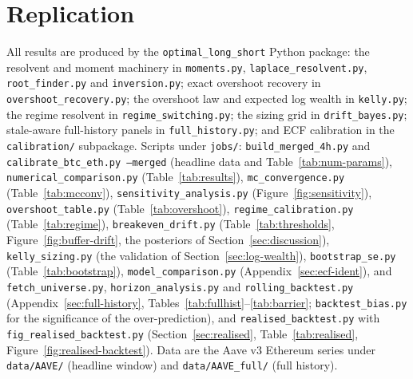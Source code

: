 \documentclass[11pt]{article}
\theoremstyle{plain}
\theoremstyle{definition}
\theoremstyle{remark}
\begin{document}
\section*{Replication}
{\sloppy All results are produced by the \texttt{optimal\_long\_short} Python package: the resolvent and
moment machinery in \texttt{moments.py}, \texttt{laplace\_resolvent.py}, \texttt{root\_finder.py} and
\texttt{inversion.py}; exact overshoot recovery in \texttt{overshoot\_recovery.py}; the overshoot law
and expected log wealth in \texttt{kelly.py}; the regime resolvent in \texttt{regime\_switching.py};
the sizing grid in \texttt{drift\_bayes.py}; stale-aware full-history panels in
\texttt{full\_history.py}; and ECF calibration in the \texttt{calibration/} subpackage. Scripts under
\texttt{jobs/}: \texttt{build\_merged\_4h.py} and \texttt{calibrate\_btc\_eth.py --merged} (headline data
and Table~\ref{tab:num-params}), \texttt{numerical\_comparison.py} (Table~\ref{tab:results}),
\texttt{mc\_convergence.py} (Table~\ref{tab:mcconv}),
\texttt{sensitivity\_analysis.py} (Figure~\ref{fig:sensitivity}), \texttt{overshoot\_table.py}
(Table~\ref{tab:overshoot}), \texttt{regime\_calibration.py} (Table~\ref{tab:regime}),
\texttt{breakeven\_drift.py} (Table~\ref{tab:thresholds}, Figure~\ref{fig:buffer-drift}, the
posteriors of Section~\ref{sec:discussion}), \texttt{kelly\_sizing.py} (the validation of
Section~\ref{sec:log-wealth}), \texttt{bootstrap\_se.py} (Table~\ref{tab:bootstrap}),
\texttt{model\_comparison.py} (Appendix~\ref{sec:ecf-ident}), and \texttt{fetch\_universe.py},
\texttt{horizon\_analysis.py} and \texttt{rolling\_backtest.py} (Appendix~\ref{sec:full-history},
Tables~\ref{tab:fullhist}--\ref{tab:barrier}; \texttt{backtest\_bias.py} for the significance of
the over-prediction), and \texttt{realised\_backtest.py} with \texttt{fig\_realised\_backtest.py}
(Section~\ref{sec:realised}, Table~\ref{tab:realised}, Figure~\ref{fig:realised-backtest}). Data are the Aave v3 Ethereum series under
\texttt{data/AAVE/} (headline window) and \texttt{data/AAVE\_full/} (full history).\par}



\end{document}
